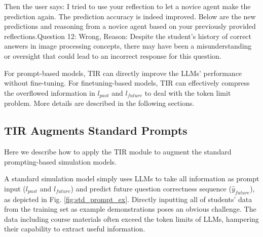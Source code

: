 \begin{figure*}
{Then the user says: I tried to use your reflection to let a novice agent make the prediction again. The prediction accuracy is indeed improved.
Below are the new predictions and reasoning from a novice agent based on your previously provided reflections.Question 12: Wrong, Reason: Despite the student's history of correct answers in image processing concepts, there may have been a misunderstanding or oversight that could lead to an incorrect response for this question.
}
\label{prompt example}
\end{figure*}


For prompt-based models, TIR can directly improve the LLMs' performance without fine-tuning. For finetuning-based models, TIR can effectively compress the overflowed information in $l_{past}$ and $l_{future}$ to deal with the token limit problem.
More details are described in the following sections.



\subsection{TIR Augments Standard Prompts}
\label{subsec: TIR augments prompts}
Here we describe how to apply the TIR module to augment the standard prompting-based simulation models. 

A standard simulation model simply uses LLMs to take all information as prompt input ($l_{past}$ and $l_{future}$) and predict future question correctness sequence ($\hat{y}_{future}$), as depicted in Fig. \ref{fig:std_prompt_ex}. Directly inputting all of students' data from the training set as example demonstrations poses an obvious challenge. The data including course materials often exceed the token limits of LLMs, hampering their capability to extract useful information.

